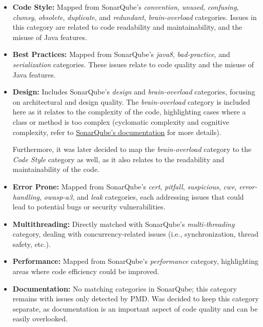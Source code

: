 \begin{itemize}
	\item \textbf{Code Style:} Mapped from SonarQube's \textit{convention}, \textit{unused}, \textit{confusing}, \textit{clumsy}, \textit{obsolete}, \textit{duplicate}, and \textit{redundant}, \textit{brain-overload} categories. Issues in this category are related to code readability and maintainability, and the misuse of Java features.

	\item \textbf{Best Practices:} Mapped from SonarQube's \textit{java8}, \textit{bad-practice}, and \textit{serialization} categories. These issues relate to code quality and the misuse of Java features.

	\item \textbf{Design:} Includes SonarQube's \textit{design} and \textit{brain-overload} categories, focusing on architectural and design quality. The \textit{brain-overload} category is included here as it relates to the complexity of the code, highlighting cases where a class or method is too complex (cyclomatic complexity and cognitive complexity, refer to \href{https://docs.sonarqube.org/latest/user-guide/metric-definitions/}{SonarQube's documentation} for more details).

	      Furthermore, it was later decided to map the \textit{brain-overload} category to the \textit{Code Style} category as well, as it also relates to the readability and maintainability of the code.

	\item \textbf{Error Prone:} Mapped from SonarQube's \textit{cert}, \textit{pitfall}, \textit{suspicious}, \textit{cwe}, \textit{error-handling}, \textit{owasp-a3}, and \textit{leak} categories, each addressing issues that could lead to potential bugs or security vulnerabilities.

	\item \textbf{Multithreading:} Directly matched with SonarQube's \textit{multi-threading} category, dealing with concurrency-related issues (i.e., synchronization, thread safety, etc.).

	\item \textbf{Performance:} Mapped from SonarQube's \textit{performance} category, highlighting areas where code efficiency could be improved.

	\item \textbf{Documentation:} No matching categories in SonarQube; this category remains with issues only detected by PMD. Was decided to keep this category separate, as documentation is an important aspect of code quality and can be easily overlooked.
\end{itemize}

